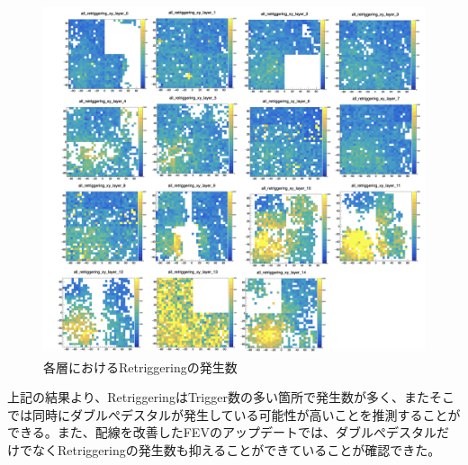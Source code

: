 \begin{figure}[H]
\begin{center}
 \includegraphics[keepaspectratio, scale=0.45]
 	{Figure/Beamtest/retrigger.png}
 		\caption[Retriggeirngのマップ]{各層におけるRetriggeringの発生数}
		\label{retrigger}
\end{center}
\end{figure}

上記の結果より、RetriggeringはTrigger数の多い箇所で発生数が多く、またそこでは同時にダブルぺデスタルが発生している可能性が高いことを推測することができる。また、配線を改善したFEVのアップデートでは、ダブルぺデスタルだけでなくRetriggeringの発生数も抑えることができていることが確認できた。